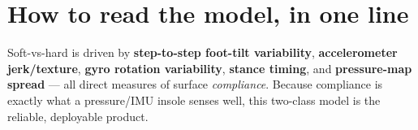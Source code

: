 \documentclass[11pt]{article}
\begin{document}
\section*{How to read the model, in one line}
Soft-vs-hard is driven by \textbf{step-to-step foot-tilt variability}, \textbf{accelerometer
jerk/texture}, \textbf{gyro rotation variability}, \textbf{stance timing}, and \textbf{pressure-map
spread} --- all direct measures of surface \emph{compliance}. Because compliance is exactly what a
pressure/IMU insole senses well, this two-class model is the reliable, deployable product.
\end{document}
